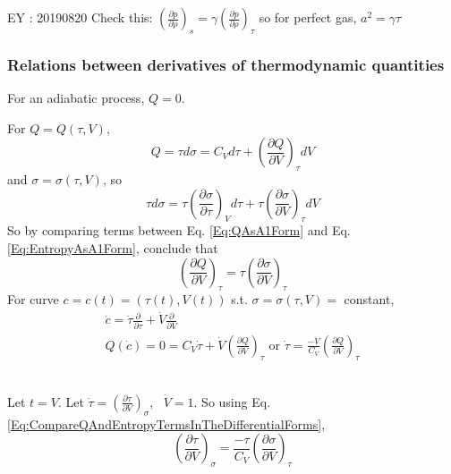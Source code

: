 \documentclass[twoside,landscape,10pt]{amsart}
\theoremstyle{plain}
\theoremstyle{definition}
\theoremstyle{remark}
\theoremstyle{remark}
\begin{document}
\begin{multicols*}{2}
EY : 20190820 Check this: $\left( \frac{\partial p }{\partial \rho} \right)_s = \gamma \left( \frac{ \partial p }{\partial \rho} \right)_{\tau}$ so for perfect gas, $a^2 = \gamma \tau$


\subsubsection{Relations between derivatives of thermodynamic quantities}

For an adiabatic process, $Q=0$. 

For $Q= Q(\tau, V)$, 
\begin{equation}\label{Eq:QAsA1Form}
Q = \tau d\sigma = C_V d\tau + \left( \frac{ \partial Q}{ \partial V} \right)_{\tau} dV
\end{equation}
and $\sigma = \sigma(\tau, V)$, so 
\begin{equation}\label{Eq:EntropyAsA1Form}
\tau d\sigma = \tau \left( \frac{ \partial \sigma}{ \partial \tau } \right)_V d\tau + \tau \left( \frac{ \partial \sigma}{ \partial V} \right)_{\tau} dV
\end{equation}
So by comparing terms between Eq. \ref{Eq:QAsA1Form} and Eq. \ref{Eq:EntropyAsA1Form}, conclude that 
\begin{equation}\label{Eq:CompareQAndEntropyTermsInTheDifferentialForms}
\left( \frac{ \partial Q}{ \partial V} \right)_{\tau} = \tau \left( \frac{ \partial \sigma}{\partial V} \right)_{\tau}
\end{equation} 
For curve $c= c(t) = (\tau(t), V(t))$ s.t. $\sigma = \sigma(\tau, V) = $ constant, 
\[
\begin{gathered}
\dot{c} = \dot{\tau} \frac{ \partial }{ \partial \tau} + \dot{V} \frac{ \partial }{\partial V}  \\
Q(\dot{c}) = 0 = C_V\dot{\tau} + \dot{V} \left( \frac{ \partial Q}{\partial V} \right)_{\tau} \text{ or } \dot{\tau} = \frac{- \dot{V}}{C_V} \left( \frac{\partial Q}{ \partial V} \right)_{\tau} 
\end{gathered}
\]

\quad \\ 
Let $t=V$. Let $\dot{\tau} = \left( \frac{\partial \tau}{\partial V} \right)_{\sigma}$, \, $\dot{V} = 1$.  So using Eq. \ref{Eq:CompareQAndEntropyTermsInTheDifferentialForms}, 
\begin{equation}\label{Eq:ConstantVolumeHeatCapacityDifferentialRelationship}
\left( \frac{ \partial \tau}{ \partial V} \right)_{\sigma} = \frac{-\tau}{C_V} \left( \frac{ \partial \sigma}{ \partial V} \right)_{\tau}
\end{equation}


\end{multicols*}
\end{document}
